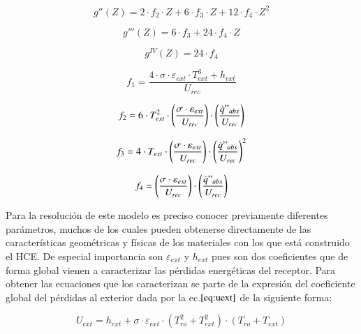 \begin{equation}
    g''(Z) = 2 \cdot f_{2} \cdot Z + 6 \cdot f_{3} \cdot Z + 12 \cdot f_{4} \cdot Z^{2} 
    \label{eq:g2primadezeta}
\end{equation}

\begin{equation}
    g'''(Z) = 6 \cdot f_{3} + 24 \cdot f_{4} \cdot Z
    \label{eq:g3primadezeta}
\end{equation}

\begin{equation}
    g^{IV}(Z) = 24 \cdot f_{4}
    \label{eq:g4primadezeta}
\end{equation}

\begin{equation}
    f_{1} = \frac{4 \cdot \sigma \cdot \varepsilon_{ext} \cdot T_{ext}^{3} + h_{ext}}{U_{rec}}
    \label{eq:f1}
\end{equation}

\begin{equation}
    f_{2} = 6 \cdot T_{ext}^{2} \cdot \left(\frac{\sigma \cdot \varepsilon_{ext}}{U_{rec}} \right) \cdot \left(\frac{\dot{q}"_{abs}}{U_{rec}}\right) 
    \label{eq:f2}
\end{equation}

\begin{equation}
    f_{3} = 4 \cdot T_{ext} \cdot \left(\frac{\sigma \cdot \varepsilon_{ext}}{U_{rec}} \right) \cdot \left(\frac{\dot{q}"_{abs}}{U_{rec}}\right)^{2} 
    \label{eq:f3}
\end{equation}

\begin{equation}
    f_{4} = \left(\frac{\sigma \cdot \varepsilon_{ext}}{U_{rec}} \right) \cdot \left(\frac{\dot{q}"_{abs}}{U_{rec}}\right) 
    \label{eq:f4}
\end{equation}

Para la resolución de este modelo es preciso conocer previamente diferentes parámetros, muchos de los cuales pueden obtenerse directamente de las características geométricas y físicas de los materiales con los que está construido el HCE. De especial importancia son \(\varepsilon_{ext}\) y \(h_{ext}\) pues son dos coeficientes que de forma global vienen a caracterizar las pérdidas energéticas del receptor. Para obtener las ecuaciones que los caracterizan se parte de la expresión del coeficiente global del pérdidas al exterior dada por la ec.\(\eqref{eq:uext}\) de la siguiente forma:

\begin{equation}
    U_{ext} = h_{ext} + \sigma \cdot \varepsilon_{ext} \cdot \left(T_{ro}^2 + T_{ext}^2 \right) \cdot \left(T_{ro} + T_{ext} \right)
    \label{eq:uext}
\end{equation}

